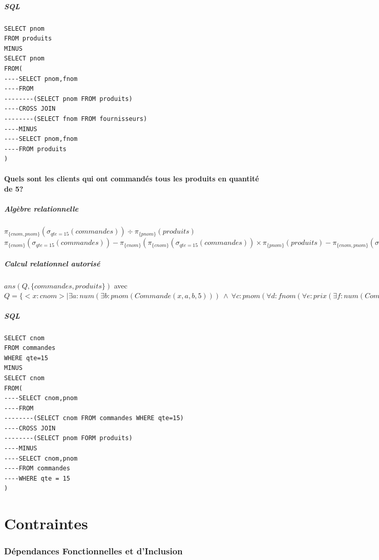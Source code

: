 \documentclass[10pt,a4paper,twoside]{article}
\begin{document}
\subsubsection{SQL}
\begin{verbatim}
SELECT pnom
FROM produits 
MINUS
SELECT pnom
FROM(
----SELECT pnom,fnom
----FROM 
--------(SELECT pnom FROM produits)
----CROSS JOIN
--------(SELECT fnom FROM fournisseurs)
----MINUS
----SELECT pnom,fnom
----FROM produits
)
\end{verbatim}

\subsection{Quels sont les clients qui ont commandés tous les produits en quantité de 5?}
\subsubsection{Algèbre relationnelle}
$\pi_{\{cnom,pnom\}}(\sigma_{qte=15}(commandes)) \div \pi_{\{pnom\}}(produits)$\\
$\pi_{\{cnom\}}(\sigma_{qte=15}(commandes)) - \pi_{\{cnom\}}(\pi_{\{cnom\}}(\sigma_{qte=15}(commandes)) \times \pi_{\{pnom\}}(produits) - \pi_{\{cnom, pnom\}}(\sigma_{qte=15}(commandes))) $
\subsubsection{Calcul relationnel autorisé}
$ans(Q,\{commandes, produits\})$ avec $Q=\{<x:cnom> \mid \exists a:num(\exists b:pnom(Commande(x,a,b,5)))\ \wedge\ \forall c:pnom(\forall d: fnom(\forall e:prix(\exists f:num(Commande(f,x,c,15)) \vee \neg Produit(c,d,e)))))\}$
\subsubsection{SQL}
\begin{verbatim}
SELECT cnom
FROM commandes
WHERE qte=15
MINUS
SELECT cnom
FROM(
----SELECT cnom,pnom
----FROM
--------(SELECT cnom FROM commandes WHERE qte=15)
----CROSS JOIN
--------(SELECT pnom FORM produits)
----MINUS
----SELECT cnom,pnom
----FROM commandes
----WHERE qte = 15
)
\end{verbatim}

\newpage
\part{Contraintes}
\section{Dépendances Fonctionnelles et d'Inclusion}
\end{document}
